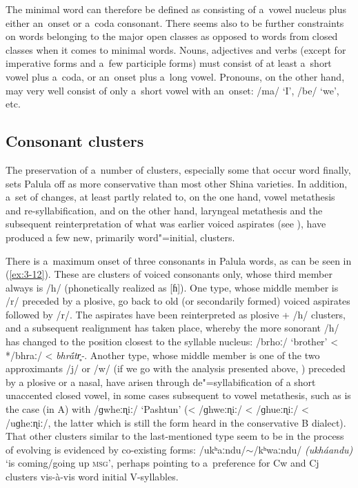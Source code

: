 The minimal word can therefore be defined as consisting of a~vowel nucleus plus either an~onset or a~coda consonant. There seems also to be further constraints on words belonging to the major open classes as opposed to words from closed classes when it comes to minimal words. Nouns, adjectives and verbs (except for imperative forms and a~few participle forms) must consist of at least a~short vowel plus a~coda, or an~onset plus a~long vowel. Pronouns, on the other hand, may very well consist of only a~short vowel with an~onset: /ma/ `I', /be/ `we', etc.


\subsection{Consonant clusters}
\label{subsec:3-3-2}


The preservation of a~number of clusters, especially some that occur word finally, sets Palula off as more conservative than most other Shina varieties. In addition, a~set of changes, at least partly related to, on the one hand, vowel metathesis and re-syllabification, and on the other hand, laryngeal metathesis and the subsequent reinterpretation of what was earlier voiced aspirates (see ), have produced a few new, primarily word"=initial, clusters.


There is a~maximum onset of three consonants in Palula words, as can be seen in (\ref{ex:3-12}). These are clusters of voiced consonants only, whose third member always is /h/ (phonetically realized as [ɦ]).  One type, whose middle member is /r/ preceded by a plosive, go back to old (or secondarily formed) voiced aspirates followed by /r/. The aspirates have been reinterpreted as plosive + /h/ clusters, and a subsequent realignment has taken place, whereby the more sonorant /h/ has changed to the position closest to the syllable nucleus: /brhoː/ `brother' < */bhraː/ < \textit{bhr\'{\={a}}tr̥-}. Another type, whose middle member is one of the two approximants /j/ or /w/ (if we go with the analysis presented above, ) preceded by a plosive or a nasal, have arisen through de"=syllabification of a short unaccented closed vowel, in some cases subsequent to vowel metathesis, such as is the case (in A) with /ɡwheːɳiː/ `Pashtun' (< /ɡhweːɳiː/ < /ɡhueːɳiː/ < /uɡheːɳiː/, the latter which is still the form heard in the conservative B dialect). That other clusters similar to the last-mentioned type seem to be in the process of evolving is evidenced by co-existing forms: /ukʰaːndu/$\sim$/kʰwaːndu/ \textit{(ukháandu)} `is coming/going up \textsc{msg}', perhaps pointing to a~preference for Cw and Cj clusters vis-à-vis word initial V-syllables. 


